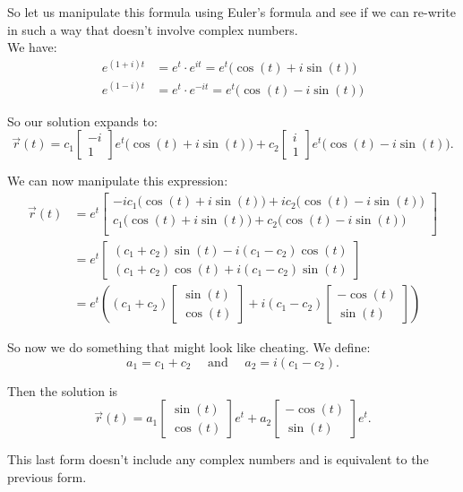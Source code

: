 \begin{example}
So let us manipulate this formula using Euler's formula and see if we can re-write in such a way that doesn't involve complex numbers. \\

We have:
\begin{align*}
	e^{(1+i)t} &= e^t \cdot e^{it} = e^t \big( \cos(t) + i \sin(t)\big) \\
	e^{(1-i)t} &= e^t \cdot e^{-it} = e^t \big( \cos(t) - i \sin(t)\big)
\end{align*}

So our solution expands to:
$$
\vec{r}(t) = c_1 \begin{bmatrix} -i \\ 1 \end{bmatrix} e^t \big( \cos(t) + i \sin(t)\big)
+c_2\begin{bmatrix} i \\ 1 \end{bmatrix} e^t \big( \cos(t) - i \sin(t)\big).
$$

We can now manipulate this expression:
\begin{align*}
\vec{r}(t) 
	& = e^t
		\begin{bmatrix}
			-i c_1 	\big( \cos(t) + i \sin(t)\big) + i c_2 \big( \cos(t) - i \sin(t)\big) \\
			c_1 	\big( \cos(t) + i \sin(t)\big) + c_2 \big( \cos(t) - i \sin(t)\big) \\
		\end{bmatrix} \\
	& = e^t 
		\begin{bmatrix}
			(c_1+c_2) \sin(t) - i (c_1-c_2) \cos(t) \\
			(c_1+c_2) \cos(t) + i(c_1-c_2) \sin(t)
		\end{bmatrix} \\
	& = e^t \left( (c_1+c_2) \begin{bmatrix} \sin(t) \\ \cos(t) \end{bmatrix}
		+ i (c_1 -c_2) \begin{bmatrix} - \cos(t) \\ \sin(t) \end{bmatrix}
		\right)
\end{align*}

So now we do something that might look like cheating. We define:
$$
a_1 = c_1+c_2 \quad \text{ and } \quad a_2 = i (c_1-c_2).
$$


Then the solution is
$$
\vec{r}(t) = a_1\begin{bmatrix} \sin(t) \\ \cos(t) \end{bmatrix} e^t
		+ a_2 \begin{bmatrix} - \cos(t) \\ \sin(t) \end{bmatrix} e^t.
$$

This last form doesn't include any complex numbers and is equivalent to the previous form.

\end{example}

